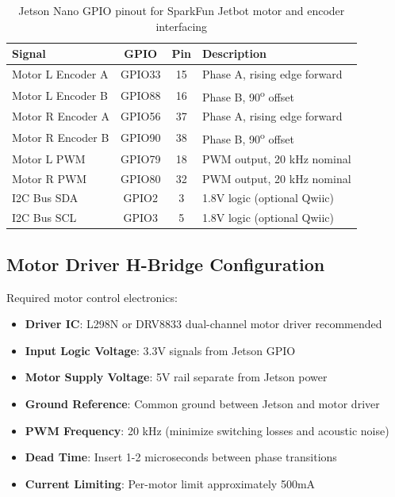 \begin{table}[h]
    \centering
    \small
    \begin{tabular}{|l|c|c|l|}
        \hline
        \textbf{Signal} & \textbf{GPIO} & \textbf{Pin} & \textbf{Description} \\
        \hline
        Motor L Encoder A & GPIO33 & 15 & Phase A, rising edge forward \\
        Motor L Encoder B & GPIO88 & 16 & Phase B, 90\textsuperscript{o} offset \\
        Motor R Encoder A & GPIO56 & 37 & Phase A, rising edge forward \\
        Motor R Encoder B & GPIO90 & 38 & Phase B, 90\textsuperscript{o} offset \\
        Motor L PWM & GPIO79 & 18 & PWM output, 20 kHz nominal \\
        Motor R PWM & GPIO80 & 32 & PWM output, 20 kHz nominal \\
        I2C Bus SDA & GPIO2 & 3 & 1.8V logic (optional Qwiic) \\
        I2C Bus SCL & GPIO3 & 5 & 1.8V logic (optional Qwiic) \\
        \hline
    \end{tabular}
    \caption{Jetson Nano GPIO pinout for SparkFun Jetbot motor and encoder interfacing}
\end{table}

\subsection{Motor Driver H-Bridge Configuration}

Required motor control electronics:

\begin{itemize}
    \item \textbf{Driver IC}: L298N or DRV8833 dual-channel motor driver recommended
    \item \textbf{Input Logic Voltage}: 3.3V signals from Jetson GPIO
    \item \textbf{Motor Supply Voltage}: 5V rail separate from Jetson power
    \item \textbf{Ground Reference}: Common ground between Jetson and motor driver
    \item \textbf{PWM Frequency}: 20 kHz (minimize switching losses and acoustic noise)
    \item \textbf{Dead Time}: Insert 1-2 microseconds between phase transitions
    \item \textbf{Current Limiting}: Per-motor limit approximately 500mA
\end{itemize}

